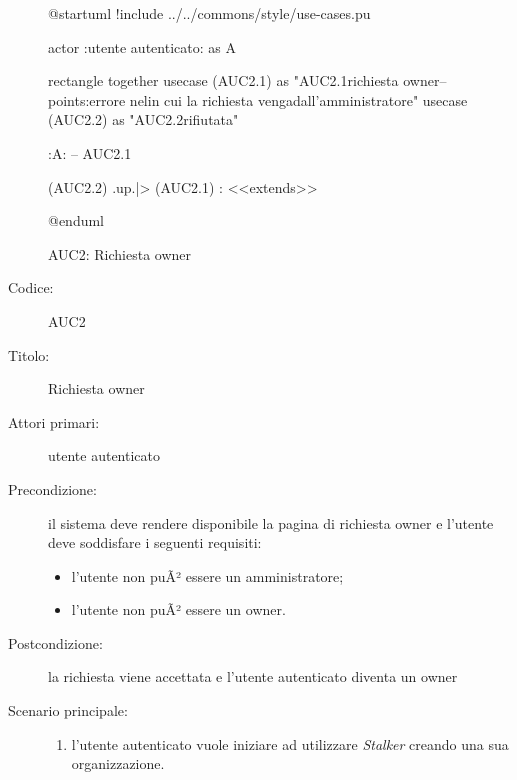 \documentclass[../../../analisi-dei-requisiti.tex]{subfiles}
\begin{document}
\begin{figure}[H]
  \centering
  \begin{plantuml}
  @startuml
  !include ../../commons/style/use-cases.pu

  actor :utente autenticato: as A

  rectangle {
    together {
      usecase (AUC2.1) as "AUC2.1\nInvio richiesta owner\n--\nExtension points:\nVisualizzazione errore nel\ncaso in cui la richiesta venga\nrifiutata dall'amministratore"
    }
      usecase (AUC2.2) as "AUC2.2\nRichiesta rifiutata"
    }

  :A: -- AUC2.1

  (AUC2.2) .up.|> (AUC2.1) : <<extends>>


  @enduml
  \end{plantuml}
  \caption{AUC2: Richiesta owner}%
  \label{fig:auc2}
\end{figure}

\begin{description}
  \item[Codice:] AUC2
  \item[Titolo:] Richiesta owner
  \item[Attori primari:] utente autenticato
  \item[Precondizione:] il sistema deve rendere disponibile la pagina di richiesta owner e l'utente deve soddisfare i seguenti requisiti:
  \begin{itemize}
    \item l'utente non puÃ² essere un amministratore;
    \item l'utente non puÃ² essere un owner.
  \end{itemize}
  \item[Postcondizione:] la richiesta viene accettata e l'utente autenticato diventa un owner
  \item[Scenario principale:]
  \begin{enumerate}
    \item l'utente autenticato vuole iniziare ad utilizzare \emph{Stalker} creando una sua organizzazione.
  \end{enumerate}
\end{description}
\end{document}
